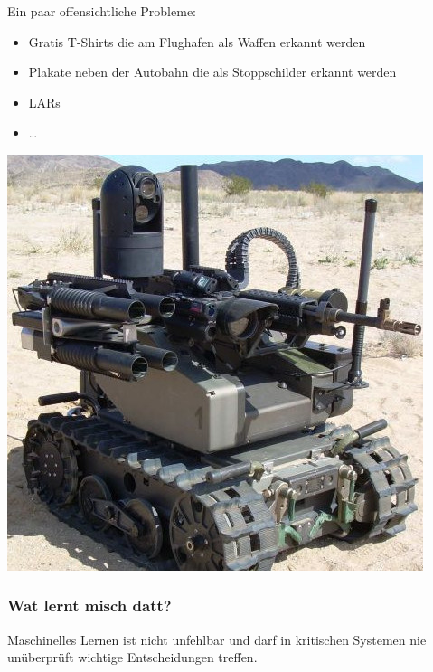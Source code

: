\documentclass[aspectratio=169,x11names]{beamer}
\begin{document}
\begin{frame}
Ein paar offensichtliche Probleme:
\bigskip
\begin{multicols}{2}
\begin{itemize}
\item Gratis T-Shirts die am Flughafen als Waffen erkannt werden
\item Plakate neben der Autobahn die als Stoppschilder erkannt werden
\item LARs
\item \dots
\end{itemize}
\columnbreak

\begin{center}
\includegraphics[scale=0.25]{images/lars.jpg} 
\end{center}

\end{multicols}
\end{frame}

\begin{frame}
\frametitle{Wat lernt misch datt?}
\begin{center}
\color{red}
\large
Maschinelles Lernen ist nicht unfehlbar und darf in kritischen Systemen nie 
unüberprüft wichtige Entscheidungen treffen.
\end{center}
\end{frame}

\end{document}

